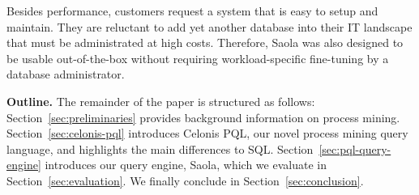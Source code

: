 Besides performance, customers request a system that is easy to setup and maintain. They are reluctant to add yet another database into their IT landscape that must be administrated at high costs. Therefore, Saola was also designed to be usable out-of-the-box without requiring workload-specific fine-tuning by a database administrator.

\par\smallskip\noindent \textbf{Outline.} The remainder of the paper is
structured as follows: Section~\ref{sec:preliminaries} provides background
information on process mining. Section~\ref{sec:celonis-pql} introduces Celonis
PQL, our novel process mining query language, and highlights the main
differences to SQL. Section~\ref{sec:pql-query-engine} introduces our query
engine, Saola, which we evaluate in Section~\ref{sec:evaluation}. We finally
conclude in Section~\ref{sec:conclusion}.

